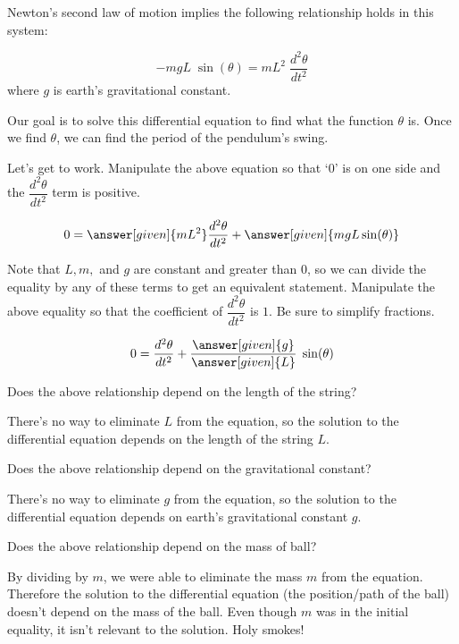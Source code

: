 \documentclass[handout,nooutcomes]{ximera}
\begin{document}
\begin{example}
\begin{explanation}
Newton's second law of motion implies the following 
relationship holds in this system:

\[
-m g L \phantom{.} \sin(\theta) = m L^2 \phantom{.}\dfrac{d^2 \theta}{d t^2}
\]
where $g$ is earth's gravitational constant.

Our goal is to solve this differential equation to find what the function
$\theta$ is. Once we find $\theta$, we can find the period of the pendulum's swing.

Let's get to work. Manipulate the above equation so that `$0$'
is on one side and the $\dfrac{d^2 \theta}{d t^2}$ term is positive.

\[
0 = \answer[given]{m L^2} \dfrac{d^2 \theta}{d t^2}  + \answer[given]{m g L \sin(\theta)}
\]

Note that $L,m,$ and $g$ are constant and greater than $0$, so we can
divide the equality by any of these terms to get an equivalent statement.
Manipulate the above equality so that the coefficient of $\dfrac{d^2 \theta}{d t^2}$
is $1$. Be sure to simplify fractions.

\[
0 = \dfrac{d^2 \theta}{d t^2}  + \dfrac{\answer[given]{g}}{\answer[given]{L}} \phantom{.} \sin(\theta)
\]

\begin{problem}
Does the above relationship depend on the length of the string?
\begin{multipleChoice}
\end{multipleChoice}
\begin{feedback}
There's no way to eliminate $L$ from the equation, so the solution
to the differential equation depends on the length of the string $L$.
\end{feedback}
\end{problem}

\begin{problem}
Does the above relationship depend on the gravitational constant?
\begin{multipleChoice}
\end{multipleChoice}
\begin{feedback}
There's no way to eliminate $g$ from the equation, so the solution
to the differential equation depends on earth's gravitational
constant $g$.
\end{feedback}
\end{problem}

\begin{problem}
Does the above relationship depend on the mass of ball?
\begin{multipleChoice}
\end{multipleChoice}
\begin{feedback}
By dividing by $m$, we were able to eliminate the mass $m$ from
the equation. Therefore the solution to the differential equation
(the position/path of the ball) doesn't depend
on the mass of the ball. Even though $m$ was in the initial equality,
it isn't relevant to the solution. Holy smokes!
\end{feedback}
\end{problem}


\end{explanation}
\end{example}
\end{document}
